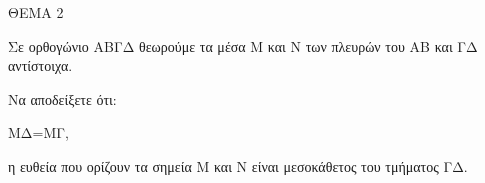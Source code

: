 
ΘΕΜΑ 2

Σε ορθογώνιο ΑΒΓΔ θεωρούμε τα μέσα Μ και Ν των πλευρών του ΑΒ και ΓΔ αντίστοιχα.

Να αποδείξετε ότι:

\begin{alist}
\item ΜΔ=ΜΓ, 

\item η ευθεία που ορίζουν τα σημεία Μ και Ν είναι μεσοκάθετος του τμήματος ΓΔ.

\end{alist}
